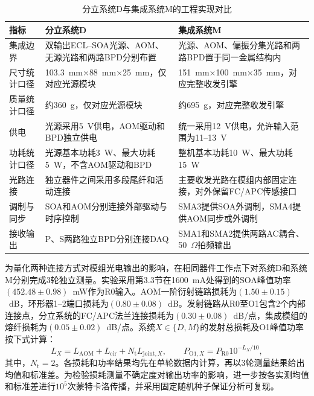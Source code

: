 \begin{table}[htbp]
  \centering
  \caption{分立系统D与集成系统M的工程实现对比}
  \label{tab:chap3_dm_engineering_comparison}
  \renewcommand{\arraystretch}{1.2}
  \small
  \begin{tabular}{p{}p{}p{}}
    \toprule
    指标 & 分立系统D & 集成系统M \\
    \midrule
    集成边界 & 双输出ECL--SOA光源、AOM、无源光路和两路BPD分别布置 & 光源、AOM、偏振分集光路和两路BPD置于同一金属结构内 \\
    尺寸统计口径 & 103.3~mm$\times$88~mm$\times$25~mm，仅对应光源模块 & 151~mm$\times$100~mm$\times$35~mm，对应完整收发引擎 \\
    质量统计口径 & 约360~g，仅对应光源模块 & 约695~g，对应完整收发引擎 \\
    供电 & 光源采用5~V供电，AOM驱动和BPD独立供电 & 统一采用12~V供电，允许输入范围为11--13~V \\
    功耗统计口径 & 光源基本功耗3~W、最大功耗5~W，不含AOM驱动和BPD & 整机基本功耗10~W、最大功耗15~W \\
    光路连接 & 独立器件之间采用多段尾纤和活动连接 & 主要收发光路在模组内部固定连接，对外保留FC/APC传感接口 \\
    调制与同步 & SOA和AOM分别连接外部驱动与时序控制 & SMA3提供SOA外调制，SMA4提供AOM同步或外调制 \\
    接收输出 & P、S两路独立BPD分别连接DAQ & SMA1和SMA2提供两路AC耦合、50~$\Omega$拍频输出 \\
    \bottomrule
  \end{tabular}
\end{table}

为量化两种连接方式对模组光电输出的影响，在相同器件工作点下对系统D和系统M分别完成3轮独立测量。实验采用第3.3节在1600~mA处得到的SOA峰值功率$(452.48\pm0.98)$~mW作为R0输入。AOM一阶衍射链路损耗为$(1.50\pm0.15)$~dB，环形器1--2端口损耗为$(0.80\pm0.08)$~dB。发射链路从R0至O1包含2个内部连接点，分立系统的FC/APC法兰连接损耗为$(0.30\pm0.08)$~dB/点，集成模组的熔纤损耗为$(0.05\pm0.02)$~dB/点。系统$X\in\{D,M\}$的发射总损耗及O1峰值功率按下式计算：
\begin{equation}
  L_{X}=L_{\mathrm{AOM}}+L_{\mathrm{cir}}+N_{\mathrm{t}}L_{\mathrm{joint},X},\qquad
  P_{\mathrm{O1},X}=P_{\mathrm{R0}}10^{-L_X/10},
  \label{eq:chap3_dm_link_budget}
\end{equation}
其中，$N_{\mathrm{t}}=2$。各损耗和功率结果均先在单轮数据内计算，再以3轮测量结果给出均值和标准差。为检验损耗测量不确定度对输出功率的影响，进一步按各实测均值和标准差进行$10^5$次蒙特卡洛传播，并采用固定随机种子保证分析可复现。

